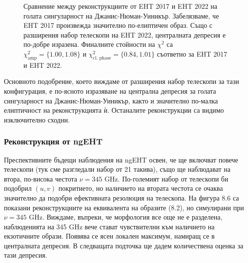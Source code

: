 \begin{figure}[h!]
\begin{subfigure}{6cm}
	\end{subfigure}
	\label{EHTIM_JNW_2017_2022}
	\caption[Сравнение между реконструкциите от EHT 2017 и EHT 2022 на голата сингуларност на Джанис-Нюман-Уиникър]{Сравнение между реконструкциите от EHT 2017 и EHT 2022 на голата сингуларност на Джанис-Нюман-Уиникър. Забелязваме, че EHT 2017 произвежда значително по-елиптичен образ. Също с разширения набор телескопи на EHT 2022, централната депресия е по-добре изразена. Финалните стойности на $\chi^2$ са $\chi^2_\text{amp} = \{1.00, 1.08\}$ и $\chi^2_\text{cl. phase} = \{0.84, 1.01\}$ съответно за EHT 2017 и EHT 2022.} 
\end{figure}

Основното подобрение, което виждаме от разширения набор телескопи за тази конфигурация, е по-ясното изразяване на централна депресия за голата сингуларност на Джанис-Нюман-Уиникър, както и значително по-малка елиптичност на реконструкцията ѝ. Останалите реконструкции са видимо изключително сходни.  
\newpage
\subsubsection{Реконструкция от ngEHT}

Преспективните бъдещи наблюдения на ngEHT освен, че ще включват повече телескопи (тук сме разгледали набор от 21 такива), също ще наблюдават на втора, по-висока честота $\nu = 345$ GHz. По-големият набор от телескопи би подобрил $(u,v)$ покритието, но наличието на втората честота се очаква значително да подобри ефективната резолюция на телескопа. На фигура 8.6 са показани реконструкциите на еквивалента на образите (8.2), но симулирани при $\nu  =345$ GHz. Виждаме, въпреки, че морфология все още не е разделена, наблюденията на 345 GHz вече стават чувствителни към наличието на екзотичните образи. Появява се ясен локален максимум, намиращ се в централната депресия. В следващата подточка ще дадем количествена оценка за тази депресия.

